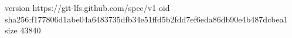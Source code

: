 version https://git-lfs.github.com/spec/v1
oid sha256:f177806d1abe04a6483735dfb34e51ffd5b2fdd7ef6eda86db90e4b487dcbea1
size 43840
